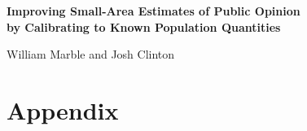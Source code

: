 \documentclass[11pt]{article}
\DeclareMathOperator*{\1}{\mathbbm{1}}
\begin{document}
\begin{bibunit}

\clearpage
\appendix
\singlespacing
\setcounter{page}{0}
\thispagestyle{empty}
\vspace*{-1em}
{\centering
\LARGE\bfseries Improving Small-Area Estimates of Public Opinion\\ by Calibrating to Known Population Quantities\par
\bigskip
\Large\normalfont William Marble and Josh Clinton\par
\vspace*{-1em}
}
\part{Appendix} %
\parttoc %
\renewcommand\thefigure{\thesection\arabic{figure}}    
\renewcommand\thetable{\thesection\arabic{table}}    
\setcounter{figure}{0}
\setcounter{table}{0}
\setcounter{footnote}{0}
\newpage


	

  \clearpage
  \renewcommand{\refname}{Appendix References} %
  \putbib
\end{bibunit}
\end{document}
